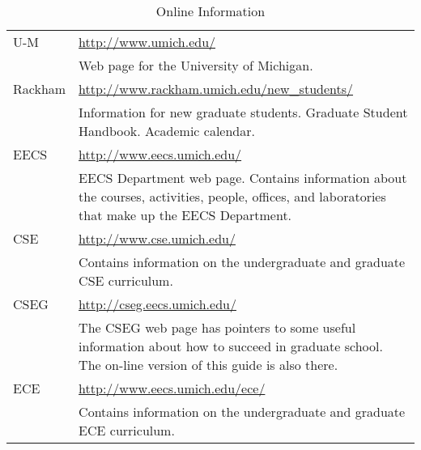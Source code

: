 \documentclass[11pt]{article}
\begin{document}
\begin{longtable}{lp{10cm}}
\caption{Online Information} \label{tbl:long}\\
\hline
\hline
 U-M               &  \href{http://www.umich.edu/}{http://www.umich.edu/}                                                                                                  \\
                   &  Web page for the University of Michigan.                                                                                                             \\
\hline
 Rackham           &  \href{http://www.rackham.umich.edu/new_students/}{http://www.rackham.umich.edu/new\_students/}                                                       \\
                   &  Information for new graduate students.  Graduate Student Handbook. Academic calendar.                                                                \\
\hline
 EECS              &  \href{http://www.eecs.umich.edu/}{http://www.eecs.umich.edu/}                                                                                        \\
                   &  EECS Department web page. Contains information about the courses, activities, people, offices, and laboratories that make up the EECS Department.    \\
\hline
 CSE               &  \href{http://www.cse.umich.edu/}{http://www.cse.umich.edu/}                                                                                          \\
                   &  Contains information on the undergraduate and graduate CSE curriculum.                                                                               \\
\hline
 CSEG              &  \href{http://cseg.eecs.umich.edu/}{http://cseg.eecs.umich.edu/}                                                                                      \\
                   &  The CSEG web page has pointers to some useful information about how to succeed in graduate school. The on-line version of this guide is also there.  \\
\hline
 ECE               &  \href{http://www.eecs.umich.edu/ece/}{http://www.eecs.umich.edu/ece/}                                                                                \\
                   &  Contains information on the undergraduate and graduate ECE curriculum.                                                                               \\

\end{longtable}
\end{document}
